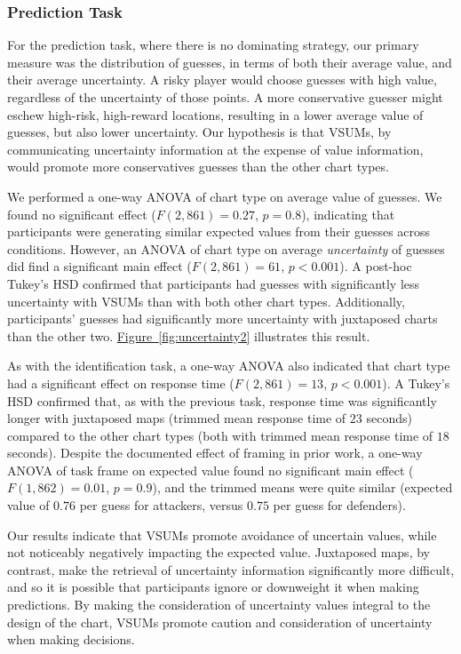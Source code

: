 \documentclass{vgtc}                          %
\newcommand{\figref}[1]{\hyperref[#1]{Figure~\ref*{#1}}}
\begin{document}
\subsubsection{Prediction Task}

\uncertaintyFig

For the prediction task, where there is no dominating strategy, our primary measure was the distribution of guesses, in terms of both their average value, and their average uncertainty. A risky player would choose guesses with high value, regardless of the uncertainty of those points. A more conservative guesser might eschew high-risk, high-reward locations, resulting in a lower average value of guesses, but also lower uncertainty. Our hypothesis is that VSUMs, by communicating uncertainty information at the expense of value information, would promote more conservatives guesses than the other chart types.

We performed a one-way ANOVA of chart type on average value of guesses. We found no significant effect ($F(2,861)=0.27$, $p=0.8$), indicating that participants were generating similar expected values from their guesses across conditions. However, an ANOVA of chart type on average \emph{uncertainty} of guesses did find a significant main effect ($F(2,861)=61$, $p<0.001$). A post-hoc Tukey's HSD confirmed that participants had guesses with significantly less uncertainty with VSUMs than with both other chart types. Additionally, participants' guesses had significantly more uncertainty with juxtaposed charts than the other two. \figref{fig:uncertainty2} illustrates this result.

As with the identification task, a one-way ANOVA also indicated that chart type had a significant effect on response time ($F(2,861)=13$, $p<0.001$). A Tukey's HSD confirmed that, as with the previous task, response time was significantly longer with juxtaposed maps (trimmed mean response time of $23$ seconds) compared to the other chart types (both with trimmed mean response time of $18$ seconds). Despite the documented effect of framing in prior work, a one-way ANOVA of task frame on expected value found no significant main effect ($F(1,862)=0.01$, $p=0.9$), and the trimmed means were quite similar (expected value of $0.76$ per guess for attackers, versus $0.75$ per guess for defenders).

Our results indicate that VSUMs promote avoidance of uncertain values, while not noticeably negatively impacting the expected value. Juxtaposed maps, by contrast, make the retrieval of uncertainty information significantly more difficult, and so it is possible that participants ignore or downweight it when making predictions. By making the consideration of uncertainty values integral to the design of the chart, VSUMs promote caution and consideration of uncertainty when making decisions.
\end{document}

